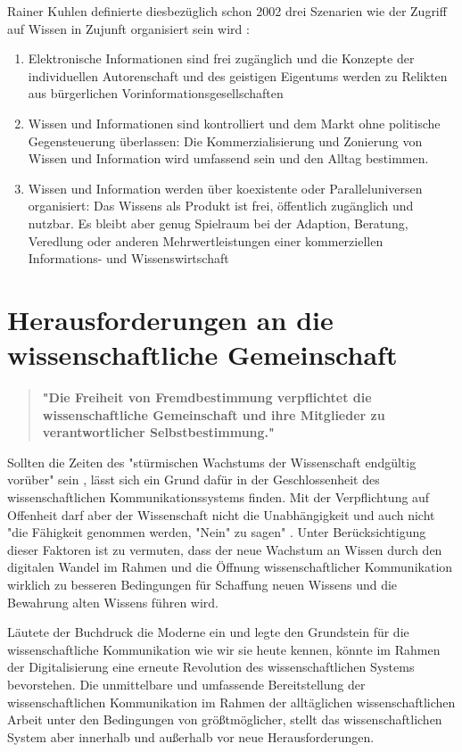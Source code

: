 Rainer Kuhlen definierte diesbezüglich schon 2002 drei Szenarien wie der Zugriff auf Wissen in Zujunft organisiert sein wird \cite{Kuhlen_2002_universalaccess}:
\begin{enumerate}
\item Elektronische Informationen sind frei zugänglich und die Konzepte der individuellen Autorenschaft und des geistigen Eigentums werden zu Relikten aus bürgerlichen Vorinformationsgesellschaften
\item Wissen und Informationen sind kontrolliert und dem Markt ohne politische Gegensteuerung überlassen: Die Kommerzialisierung und Zonierung von Wissen und Information wird umfassend sein und den Alltag bestimmen.
\item Wissen und Information werden über koexistente oder Paralleluniversen organisiert: Das Wissens als Produkt ist frei, öffentlich zugänglich und nutzbar. Es bleibt aber genug Spielraum bei der Adaption, Beratung, Veredlung oder anderen Mehrwertleistungen einer kommerziellen Informations- und Wissenswirtschaft
\end{enumerate}

\section{Herausforderungen an die wissenschaftliche Gemeinschaft}

\begin{quote}
\textbf{"Die Freiheit von Fremdbestimmung verpflichtet die wissenschaftliche Gemeinschaft und ihre Mitglieder zu verantwortlicher Selbstbestimmung."}
\end{quote} \cite{Oezmen_2015}

Sollten die Zeiten des "stürmischen Wachstums der Wissenschaft endgültig vorüber" sein \cite{K_lbel_2002}, lässt sich ein Grund dafür in der Geschlossenheit des wissenschaftlichen Kommunikationssystems finden. Mit der Verpflichtung auf Offenheit darf aber der Wissenschaft nicht die Unabhängigkeit und auch nicht "die Fähigkeit genommen werden, "Nein" zu sagen" \cite{suchen_Hornbostel_2006}. Unter Berücksichtigung dieser Faktoren ist zu vermuten, dass der neue Wachstum an Wissen durch den digitalen Wandel im Rahmen und die Öffnung wissenschaftlicher Kommunikation wirklich zu besseren Bedingungen für Schaffung neuen Wissens und die Bewahrung alten Wissens führen wird.

Läutete der Buchdruck die Moderne ein und legte den Grundstein für die wissenschaftliche Kommunikation wie wir sie heute kennen, könnte im Rahmen der Digitalisierung eine erneute Revolution des wissenschaftlichen Systems bevorstehen. Die unmittelbare und umfassende Bereitstellung der wissenschaftlichen Kommunikation im Rahmen der alltäglichen wissenschaftlichen Arbeit unter den Bedingungen von größtmöglicher, stellt das wissenschaftlichen System aber innerhalb und außerhalb vor neue Herausforderungen.

